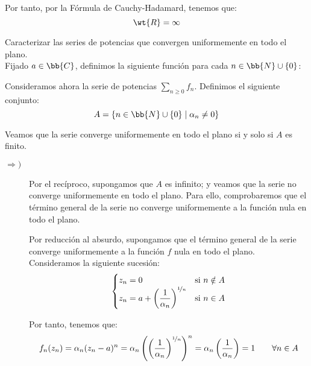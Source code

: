 \begin{ejercicio}
\begin{enumerate}
\begin{itemize}
\begin{itemize}
                Por tanto, por la Fórmula de Cauchy-Hadamard, tenemos que:
                \begin{equation*}
                    \wt{R} = \infty
                \end{equation*}
            \end{itemize}
        \end{itemize}
    \end{enumerate}
\end{ejercicio}

\begin{ejercicio}
    Caracterizar las series de potencias que convergen uniformemente en todo el plano.\\

    Fijado $a\in \bb{C}$, definimos la siguiente función para cada $n\in \bb{N}\cup \{0\}$:

    Consideramos ahora la serie de potencias $\displaystyle \sum_{n \geq 0}f_n$. Definimos el siguiente conjunto:
    \begin{equation*}
        A=\left\{n\in \bb{N}\cup \{0\}\mid \alpha_n\neq 0\right\}
    \end{equation*}

    Veamos que la serie converge uniformemente en todo el plano si y solo si $A$ es finito.
    \begin{description}
        \item[$\Longrightarrow)$] Por el recíproco, supongamos que $A$ es infinito; y veamos que la serie no converge uniformemente en todo el plano. Para ello, comprobaremos que el término general de la serie no converge uniformemente a la función nula en todo el plano.
        
        Por reducción al absurdo, supongamos que el término general de la serie converge uniformemente a la función $f$ nula en todo el plano.
        Consideramos la siguiente sucesión:
        \begin{equation*}
            \begin{cases}
                z_n = 0 & \text{si } n\notin A\\
                z_n = a+\left(\dfrac{1}{\alpha_n}\right)^{\nicefrac{1}{n}} & \text{si } n\in A
            \end{cases}
        \end{equation*}

        Por tanto, tenemos que:
        \begin{equation*}
            f_n(z_n)=\alpha_n(z_n-a)^n = \alpha_n\left(\left(\dfrac{1}{\alpha_n}\right)^{\nicefrac{1}{n}}\right)^n = \alpha_n\left(\dfrac{1}{\alpha_n}\right) = 1 \qquad \forall n\in A
        \end{equation*}


\end{description}
\end{ejercicio}
